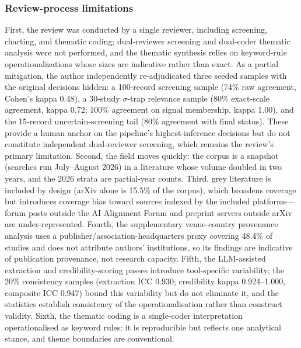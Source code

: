 \subsubsection{Review-process limitations}
First, the review was conducted by a single reviewer, including screening, charting, and thematic coding; dual-reviewer screening and dual-coder thematic analysis were not performed, and the thematic synthesis relies on keyword-rule operationalizations whose sizes are indicative rather than exact. As a partial mitigation, the author independently re-adjudicated three seeded samples with the original decisions hidden: a 100-record screening sample (74\% raw agreement, Cohen's kappa 0.48), a 30-study $\sigma$-trap relevance sample (80\% exact-scale agreement, kappa 0.72; 100\% agreement on signal membership, kappa 1.00), and the 15-record uncertain-screening tail (80\% agreement with final status). These provide a human anchor on the pipeline's highest-inference decisions but do not constitute independent dual-reviewer screening, which remains the review's primary limitation. Second, the field moves quickly: the corpus is a snapshot (searches run July--August 2026) in a literature whose volume doubled in two years, and the 2026 strata are partial-year counts. Third, grey literature is included by design (arXiv alone is 15.5\% of the corpus), which broadens coverage but introduces coverage bias toward sources indexed by the included platforms---forum posts outside the AI Alignment Forum and preprint servers outside arXiv are under-represented. Fourth, the supplementary venue-country provenance analysis uses a publisher/association-headquarters proxy covering 48.4\% of studies and does not attribute authors' institutions, so its findings are indicative of publication provenance, not research capacity. Fifth, the LLM-assisted extraction and credibility-scoring passes introduce tool-specific variability; the 20\% consistency samples (extraction ICC 0.930; credibility kappa 0.924--1.000, composite ICC 0.947) bound this variability but do not eliminate it, and the statistics establish consistency of the operationalisation rather than construct validity. Sixth, the thematic coding is a single-coder interpretation operationalised as keyword rules: it is reproducible but reflects one analytical stance, and theme boundaries are conventional.

